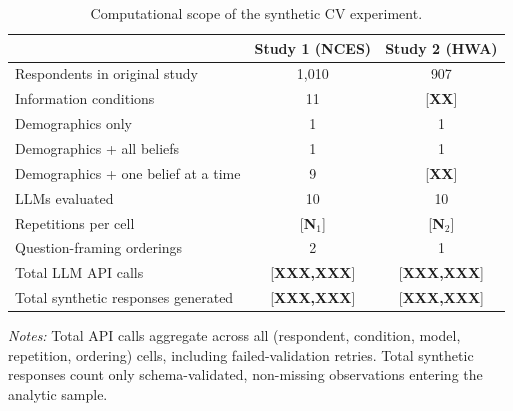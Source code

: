 
\begin{table}[h]
    \centering
    \caption{Computational scope of the synthetic CV experiment.}
    \begin{threeparttable}
    \begin{tabular}{lcc}
        \toprule
                                                       & Study 1 (NCES) & Study 2 (HWA) \\
        \midrule
        Respondents in original study                  & 1{,}010        & 907 \\
        Information conditions                         & 11             & [\textbf{XX}] \\
        \quad Demographics only                        & 1              & 1 \\
        \quad Demographics + all beliefs               & 1              & 1 \\
        \quad Demographics + one belief at a time      & 9              & [\textbf{XX}] \\
        LLMs evaluated                                 & 10             & 10 \\
        Repetitions per cell                           & [\textbf{N$_1$}] & [\textbf{N$_2$}] \\
        Question-framing orderings                     & 2              & 1 \\
        Total LLM API calls                            & [\textbf{XXX,XXX}] & [\textbf{XXX,XXX}] \\
        Total synthetic responses generated            & [\textbf{XXX,XXX}] & [\textbf{XXX,XXX}] \\
        \bottomrule
    \end{tabular}
    \begin{tablenotes}\footnotesize
    \item \textit{Notes:} Total API calls aggregate across all
    (respondent, condition, model, repetition, ordering) cells, including
    failed-validation retries. Total synthetic responses count only
    schema-validated, non-missing observations entering the analytic sample.
    \end{tablenotes}
    \end{threeparttable}
\end{table}